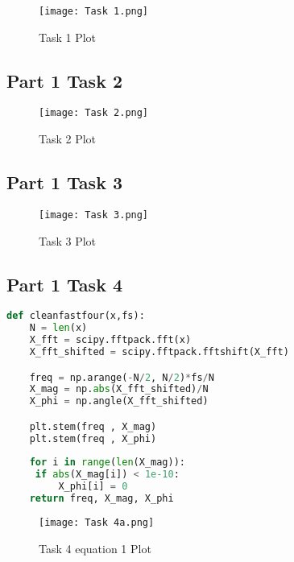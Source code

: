 \documentclass[11pt,a4]{report}
\begin{document}
\begin{figure}[h!]
    \begin{center}
  \caption{Task 1 Plot}
  \texttt{[image: Task 1.png]}
\end{center}
\end{figure}
\newpage

\subsection{Part 1 Task 2}

\begin{figure}[h!]
    \begin{center}
  \caption{Task 2 Plot}
  \texttt{[image: Task 2.png]}
\end{center}
\end{figure}
\newpage
\subsection{Part 1 Task 3}

\begin{figure}[h!]
    \begin{center}
  \caption{Task 3 Plot}
  \texttt{[image: Task 3.png]}
\end{center}
\end{figure}

\subsection{Part 1 Task 4}

\begin{lstlisting}[language=Python]
def cleanfastfour(x,fs):
    N = len(x)
    X_fft = scipy.fftpack.fft(x)
    X_fft_shifted = scipy.fftpack.fftshift(X_fft) 

    freq = np.arange(-N/2, N/2)*fs/N
    X_mag = np.abs(X_fft_shifted)/N 
    X_phi = np.angle(X_fft_shifted)

    plt.stem(freq , X_mag)
    plt.stem(freq , X_phi)
    
    for i in range(len(X_mag)):
     if abs(X_mag[i]) < 1e-10:
         X_phi[i] = 0
    return freq, X_mag, X_phi
\end{lstlisting}
\newpage

\begin{figure}[h!]
    \begin{center}
  \caption{Task 4 equation 1 Plot}
  \texttt{[image: Task 4a.png]}
\end{center}
\end{figure}
\end{document}
